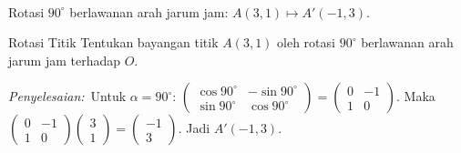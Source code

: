 \documentclass[11pt,a4paper]{report}
\theoremstyle{gaya}
\newcommand{\jawab}{\par\smallskip\noindent\textit{\textcolor{oranye}{Penyelesaian:}}\ }
\begin{document}
\begin{center}
\\
\small Rotasi $90^\circ$ berlawanan arah jarum jam: $A(3,1)\mapsto A'(-1,3)$.
\end{center}

\begin{contoh}{Rotasi Titik}
Tentukan bayangan titik $A(3,1)$ oleh rotasi $90^\circ$ berlawanan arah jarum jam terhadap $O$.

\jawab Untuk $\alpha=90^\circ$: $\begin{pmatrix}\cos90^\circ&-\sin90^\circ\\ \sin90^\circ&\cos90^\circ\end{pmatrix}=\begin{pmatrix}0&-1\\1&0\end{pmatrix}$. Maka
$\begin{pmatrix}0&-1\\1&0\end{pmatrix}\begin{pmatrix}3\\1\end{pmatrix}
= \begin{pmatrix}-1\\3\end{pmatrix}.$ Jadi $A'(-1,3)$.
\end{contoh}
\end{document}
